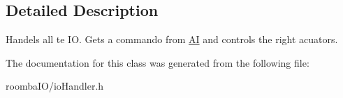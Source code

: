 \subsection{Detailed Description}
Handels all te IO. Gets a commando from \mbox{\hyperlink{class_a_i}{AI}} and controls the right acuators. 

The documentation for this class was generated from the following file\+:\begin{DoxyCompactItemize}
\item 
roomba\+I\+O/io\+Handler.\+h\end{DoxyCompactItemize}
